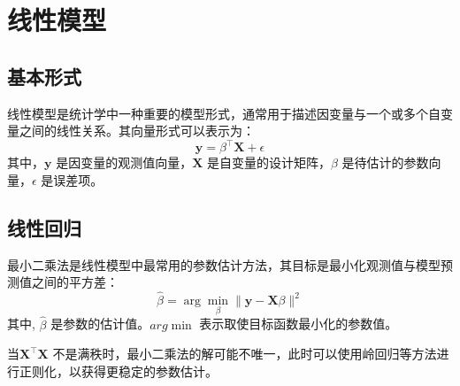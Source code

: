 \section{线性模型}
\subsection{基本形式}
线性模型是统计学中一种重要的模型形式，通常用于描述因变量与一个或多个自变量之间的线性关系。其向量形式可以表示为：
\begin{equation}
\mathbf{y} = \beta^\top \mathbf{X} + \epsilon
\end{equation}
其中，$\mathbf{y}$ 是因变量的观测值向量，$\mathbf{X}$ 是自变量的设计矩阵，$\beta$ 是待估计的参数向量，$\epsilon$ 是误差项。
\subsection{线性回归}
最小二乘法是线性模型中最常用的参数估计方法，其目标是最小化观测值与模型预测值之间的平方差：
\begin{equation}
\hat{\beta} = \arg\min_{\beta} \|\mathbf{y} - \mathbf{X} \beta\|^2
\end{equation}
其中, $\hat{\beta}$ 是参数的估计值。$arg\min$ 表示取使目标函数最小化的参数值。

当$\mathbf{X}^\top \mathbf{X}$ 不是满秩时，最小二乘法的解可能不唯一，此时可以使用岭回归等方法进行正则化，以获得更稳定的参数估计。

